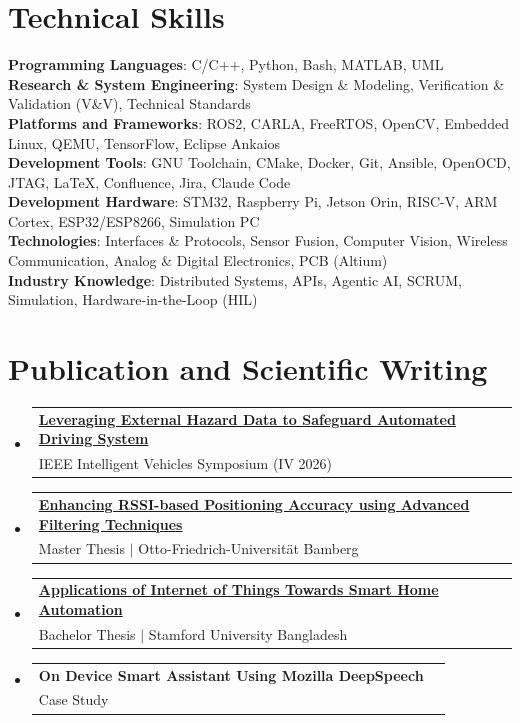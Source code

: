 \documentclass[a4paper,11pt]{article}
\makeatletter
\newcommand{\CVSubheading}[4]{
  \vspace{-2pt}\item
    \begin{tabular*}{0.97\textwidth}[t]{l@{\extracolsep{\fill}}r}
      \textbf{#1} & #2 \\
      \small#3 & \small #4 \\
    \end{tabular*}\vspace{-7pt}
}
\newcommand{\CVSubHeadingListStart}{\begin{itemize}[leftmargin=0.5cm, label={}]}
\newcommand{\CVSubHeadingListEnd}{\end{itemize}}
\makeatother
\begin{document}
\section{Technical Skills}
 \begin{itemize}[leftmargin=0.5cm, label={}]
    \small{\item{
     \textbf{Programming Languages}{: C/C++, Python, Bash, MATLAB, UML} \\
     \textbf{Research \& System Engineering}{: System Design \& Modeling, Verification \& Validation (V\&V), Technical Standards} \\
     \textbf{Platforms and Frameworks}{: ROS2, CARLA, FreeRTOS, OpenCV, Embedded Linux, QEMU, TensorFlow, Eclipse Ankaios} \\
     \textbf{Development Tools}{: GNU Toolchain, CMake, Docker, Git, Ansible, OpenOCD, JTAG, LaTeX, Confluence, Jira, Claude Code} \\
     \textbf{Development Hardware}{: STM32, Raspberry Pi, Jetson Orin, RISC-V, ARM Cortex, ESP32/ESP8266, Simulation PC} \\
     \textbf{Technologies}{: Interfaces \& Protocols, Sensor Fusion, Computer Vision, Wireless Communication, Analog \& Digital Electronics, PCB (Altium)} \\
     \textbf{Industry Knowledge}{: Distributed Systems, APIs, Agentic AI, SCRUM, Simulation, Hardware-in-the-Loop (HIL)} \\
    }}
 \end{itemize}

\section{Publication and Scientific Writing}
  \CVSubHeadingListStart
    \CVSubheading
      {\href{https://ieeexplore.ieee.org/document/11624101}{Leveraging External Hazard Data to Safeguard Automated Driving System}}{}
      {IEEE Intelligent Vehicles Symposium (IV 2026)}{}
    \CVSubheading
      {\href{https://www.researchgate.net/publication/400899464_Enhanching_RSSI-based_Positioning_Accuracy_using_Advanced_Filtering_Techniques}{Enhancing RSSI-based Positioning Accuracy using Advanced Filtering Techniques}}{}
      {Master Thesis $|$ Otto-Friedrich-Universität Bamberg}{}
    \CVSubheading
      {\href{https://www.researchgate.net/publication/400899541_Applications_of_Internet_of_Things_Towards_Smart_Home_Automation}{Applications of Internet of Things Towards Smart Home Automation}}{}
      {Bachelor Thesis $|$ Stamford University Bangladesh}{}
    \CVSubheading
      {On Device Smart Assistant Using Mozilla DeepSpeech}{}
      {Case Study}{}
  \CVSubHeadingListEnd
\end{document}
